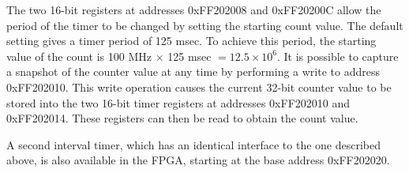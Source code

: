 The two 16-bit registers at addresses {\sf 0xFF202008} and {\sf 0xFF20200C}
allow the period of the timer to be changed by
setting the starting count value.  The default setting gives a timer period of 125 msec. 
To achieve this period, the starting value of the count is
100 MHz $\times$ 125 msec $=12.5\times10^6$. It is possible to capture a snapshot of the 
counter value at any time by performing a write to address {\sf 0xFF202010}. This write
operation causes the current 32-bit counter value to be stored into the two 16-bit timer
registers at addresses {\sf 0xFF202010} and {\sf 0xFF202014}. These registers can then be
read to obtain the count value.

A second interval timer, which has an identical interface to the one described above, is also 
available in the FPGA, starting at the base address {\sf 0xFF202020}.

